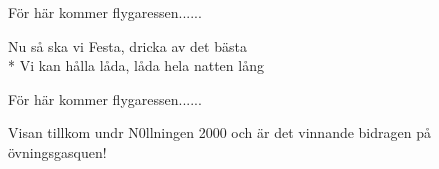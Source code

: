 \begin{SongText}
\begin{SongVerse}
        För här kommer flygaressen......
    \end{SongVerse}
    \begin{SongVerse}
        Nu så ska vi Festa, dricka av det bästa\\*%
        Vi kan hålla låda, låda hela natten lång
    \end{SongVerse}
    \begin{SongVerse}
        För här kommer flygaressen......
    \end{SongVerse}
    \begin{SongInfo}
        Visan tillkom undr N0llningen 2000 och är det vinnande bidragen på övningsgasquen!
    \end{SongInfo}
\end{SongText}
